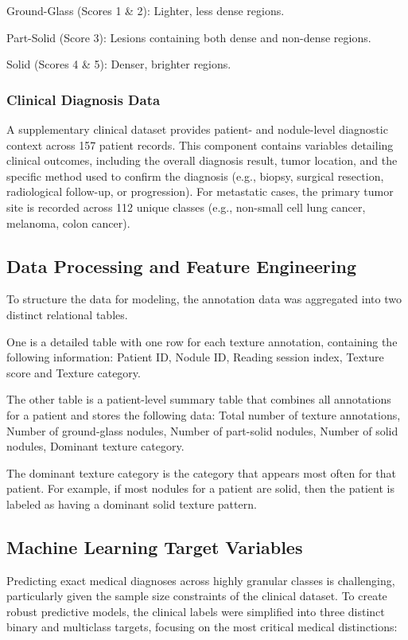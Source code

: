Ground-Glass (Scores 1 \& 2): Lighter, less dense regions.

Part-Solid (Score 3): Lesions containing both dense and non-dense regions.

Solid (Scores 4 \& 5): Denser, brighter regions.

\subsubsection{Clinical Diagnosis Data}
A supplementary clinical dataset provides patient- and nodule-level diagnostic context across 157 patient records. This component contains variables detailing clinical outcomes, including the overall diagnosis result, tumor location, and the specific method used to confirm the diagnosis (e.g., biopsy, surgical resection, radiological follow-up, or progression). For metastatic cases, the primary tumor site is recorded across 112 unique classes (e.g., non-small cell lung cancer, melanoma, colon cancer).


\subsection{Data Processing and Feature Engineering}
To structure the data for modeling, the annotation data was aggregated into two distinct relational tables.

One is a detailed table with one row for each texture annotation, containing the following information: Patient ID, Nodule ID, Reading session index, Texture score and Texture category.

The other table is a patient-level summary table that combines all annotations for a patient and stores the following data: Total number of texture annotations, Number of ground-glass nodules, Number of part-solid nodules, Number of solid nodules, Dominant texture category.

The dominant texture category is the category that appears most often for that patient. For example, if most nodules for a patient are solid, then the patient is labeled as having a dominant solid texture pattern.

\subsection{Machine Learning Target Variables}
Predicting exact medical diagnoses across highly granular classes is challenging, particularly given the sample size constraints of the clinical dataset. To create robust predictive models, the clinical labels were simplified into three distinct binary and multiclass targets, focusing on the most critical medical distinctions:

